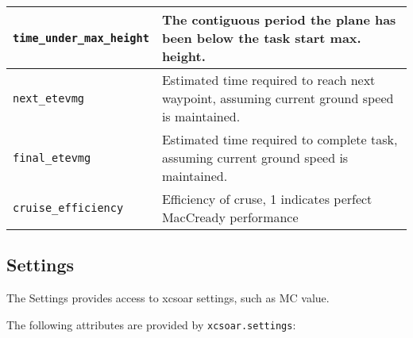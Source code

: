 \begin{maxipage}
\begin{tabularx}{1.9\textwidth}{l|X}
\hline

\verb|time_under_max_height| & The contiguous period the plane has 
been below the task \newline start max. height. \\

\hline

\verb|next_etevmg| & Estimated time required to reach next waypoint, 
assuming current \newline ground speed is maintained. \\

\hline

\verb|final_etevmg| & Estimated time required to complete task, 
assuming current ground \newline speed is maintained. \\

\hline

\verb|cruise_efficiency| & Efficiency of cruse, 1 indicates perfect 
MacCready performance \\


\end{tabularx}
\end{maxipage}

\subsection{Settings}

The Settings provides access to xcsoar settings, such as MC value.

The following attributes are provided by \verb|xcsoar.settings|:

